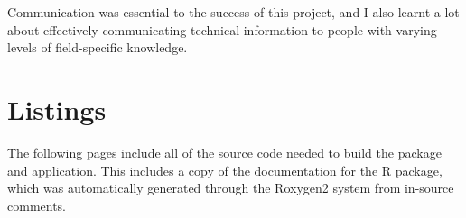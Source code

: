 \message{ !name(jason-cairns-dissertation.tex)}\documentclass[11pt, a4paper, titlepage]{report}
\begin{document}
Communication was essential to the success of this project, and I also
learnt a lot about effectively communicating technical information to
people with varying levels of field-specific knowledge.



\appendix
\appendixpage{}
\addappheadtotoc{}
\chapter{Listings}\label{cha:appendix}

The following pages include all of the source code needed to build the
package and application. This includes a copy of the documentation for
the R package, which was automatically generated through the Roxygen2
system from in-source comments.



%   

\inputminted[frame=lines,fontsize=\scriptsize,xleftmargin=\parindent,linenos]{R}{R/import-txt.R}

\inputminted[frame=lines,fontsize=\scriptsize,xleftmargin=\parindent,linenos]{R}{R/import-csv.R}

\inputminted[frame=lines,fontsize=\scriptsize,xleftmargin=\parindent,linenos]{R}{R/import-excel.R}

\inputminted[frame=lines,fontsize=\scriptsize,xleftmargin=\parindent,linenos]{R}{R/import-files.R}

\inputminted[frame=lines,fontsize=\scriptsize,xleftmargin=\parindent,linenos]{R}{R/text-prep.R}

\inputminted[frame=lines,fontsize=\scriptsize,xleftmargin=\parindent,linenos]{R}{R/stopwords.R}

\inputminted[frame=lines,fontsize=\scriptsize,xleftmargin=\parindent,linenos]{R}{R/format-data.R}
\end{document}
